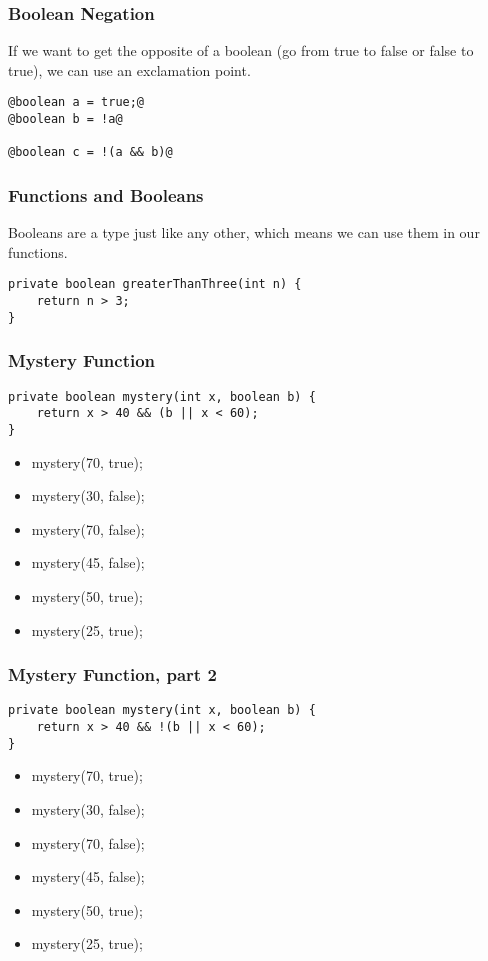 \documentclass{beamer}
\begin{document}
\begin{frame}[fragile]
\frametitle{Boolean Negation}
If we want to get the opposite of a boolean (go from true to false or false to true), we can use an exclamation point.

\begin{lstlisting}[style=base]
@boolean a = true;@
@boolean b = !a@

@boolean c = !(a && b)@
\end{lstlisting}
\end{frame}

\begin{frame}[fragile]
\frametitle{Functions and Booleans}
Booleans are a type just like any other, which means we can use them in our functions.
\pause
\begin{lstlisting}
private boolean greaterThanThree(int n) {
    return n > 3;
}
\end{lstlisting}
\end{frame}

\begin{frame}[fragile]
\frametitle{Mystery Function}
\begin{lstlisting}
private boolean mystery(int x, boolean b) {
    return x > 40 && (b || x < 60);
}
\end{lstlisting}
\begin{itemize}
\item<2->mystery(70, true);
\item<3->mystery(30, false);
\item<4->mystery(70, false);
\item<5->mystery(45, false);
\item<6->mystery(50, true);
\item<7->mystery(25, true);
\end{itemize}
\end{frame}

\begin{frame}[fragile]
\frametitle{Mystery Function, part 2}
\begin{lstlisting}
private boolean mystery(int x, boolean b) {
    return x > 40 && !(b || x < 60);
}
\end{lstlisting}
\begin{itemize}
\item<2->mystery(70, true);
\item<3->mystery(30, false);
\item<4->mystery(70, false);
\item<5->mystery(45, false);
\item<6->mystery(50, true);
\item<7->mystery(25, true);
\end{itemize}
\end{frame}
\end{document}
